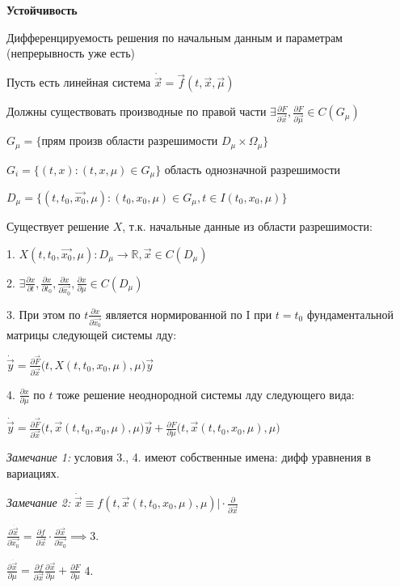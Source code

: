 \documentclass[12pt, a4paper]{article}
\begin{document}
    \textbf{\large Устойчивость}

    Дифференцируемость решения по начальным данным и параметрам (непрерывность уже есть)

    Пусть есть линейная система $\dot{\vec{x}} = \vec f(t,\vec{x}, \vec{\mu})$

    Должны существовать производные по правой части $\exists \frac{\partial F}{\partial \vec x}, \frac{\partial F}{\partial \vec\mu} \in C(G_\mu)$

    $G_\mu = \{ \text{прям произв области разрешимости }D_\mu \times \Omega_\mu \}$

    $G_i = \{ (t,x): (t,x, \mu) \in G_\mu \}$ область однозначной разрешимости 

    $D_\mu = \{(t, t_0, \vec{x_0}, \mu) : (t_0, x_0, \mu) \in G_\mu, t \in I(t_0, x_0, \mu)\}$

    Существует решение $X$, т.к. начальные данные из области разрешимости:

    1. $X(t, t_0, \vec{x_0}, \mu) : D_\mu \to \mathbb{R}, \vec{x} \in C(D_\mu)$
    
    2. $\exists \frac{\partial x}{\partial t}, \frac{\partial x}{\partial t_0}, \frac{\partial x}{\partial \vec{x_0}}, \frac{\partial x}{\partial \mu} \in C(D_\mu)$

    3. При этом по $t \frac{\partial x}{\partial \vec{x_0}}$ является нормированной по I при $t=t_0$ фундаментальной матрицы следующей системы лду:

    $\dot{\vec{y}} = \frac{\partial \vec F}{\partial \vec{x}}\big(t, X(t, t_0, x_0, \mu), \mu\big)\vec{y}$

    4. $\frac{\partial x}{\partial \mu}$ по $t$ тоже решение неоднородной системы лду следующего вида:

    $\dot{\vec{y}} = \frac{\partial \vec{F}}{\partial \vec{x}}\big(t, \vec{x}(t, t_0, x_0, \mu), \mu\big)\vec{y} + \frac{\partial F}{\partial \mu}\big(t, \vec{x}(t, t_0, x_0, \mu), \mu\big)$

    \textit{Замечание 1:} условия 3., 4. имеют собственные имена: дифф уравнения в вариациях.
    
    \textit{Замечание 2:} $\dot{\vec{x}} \equiv f(t, \vec{x}(t, t_0, x_0, \mu),\mu) \big | \cdot \frac{\partial }{\partial \vec{x}}$ 

    $\frac{\partial \dot{\vec{x}}}{\partial \vec{x_0}} = \frac{\partial f }{\partial \vec{x}}\cdot \frac{\partial \vec{x}}{\partial \vec{x_0}} \implies 3.$ %

    $\frac{\partial \dot{\vec{x}}}{\partial \mu} = \frac{\partial f}{\partial \vec{x}} \frac{\partial \vec{x}}{\partial \mu} + \frac{\partial F}{\partial \mu}$ 4.
    
\end{document}
